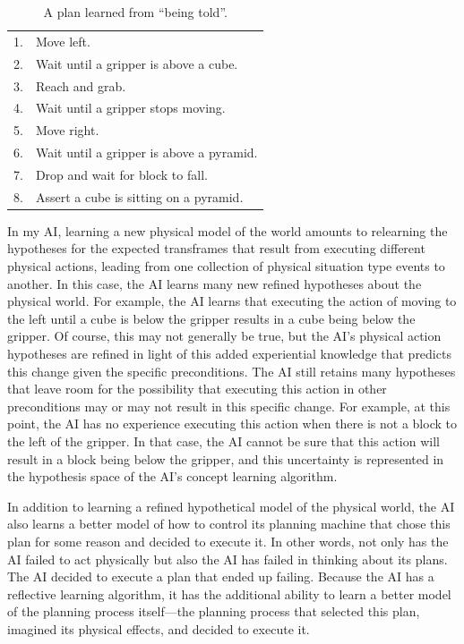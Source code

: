 \begin{table}
\centering
\begin{tabular}{|rl|}
\hline
 1. & Move left.\\
 2. & Wait until a gripper is above a cube.\\
 3. & Reach and grab.\\
 4. & Wait until a gripper stops moving.\\
 5. & Move right.\\
 6. & Wait until a gripper is above a pyramid.\\
 7. & Drop and wait for block to fall.\\
 8. & Assert a cube is sitting on a pyramid.\\
\hline
\end{tabular}
\caption[A plan learned from ``being told''.]{A plan learned from
  ``being told''.}
\label{table:a_plan_learned_from_being_told}
\end{table}
In my AI, learning a new physical model of the world amounts to
relearning the hypotheses for the expected transframes that result
from executing different physical actions, leading from one collection
of physical situation type events to another.  In this case, the AI
learns many new refined hypotheses about the physical world.  For
example, the AI learns that executing the action of moving to the left
until a cube is below the gripper results in a cube being below the
gripper.  Of course, this may not generally be true, but the AI's
physical action hypotheses are refined in light of this added
experiential knowledge that predicts this change given the specific
preconditions.  The AI still retains many hypotheses that leave room
for the possibility that executing this action in other preconditions
may or may not result in this specific change.  For example, at this
point, the AI has no experience executing this action when there is
not a block to the left of the gripper.  In that case, the AI cannot
be sure that this action will result in a block being below the
gripper, and this uncertainty is represented in the hypothesis space
of the AI's concept learning algorithm.

In addition to learning a refined hypothetical model of the physical
world, the AI also learns a better model of how to control its
planning machine that chose this plan for some reason and decided to
execute it.  In other words, not only has the AI failed to act
physically but also the AI has failed in thinking about its plans.
The AI decided to execute a plan that ended up failing.  Because the
AI has a reflective learning algorithm, it has the additional ability
to learn a better model of the planning process itself---the planning
process that selected this plan, imagined its physical effects, and
decided to execute it.

